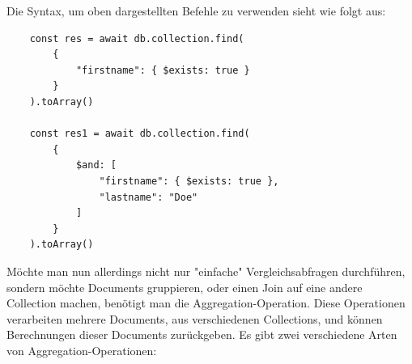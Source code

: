 \cite{mongodb_query_operations}
\newline
Die Syntax, um oben dargestellten Befehle zu verwenden sieht wie folgt aus:
\newline
\begin{lstlisting}
    const res = await db.collection.find(
        {
            "firstname": { $exists: true }
        }
    ).toArray()

    const res1 = await db.collection.find(
        {
            $and: [
                "firstname": { $exists: true },
                "lastname": "Doe"
            ]
        }
    ).toArray()
\end{lstlisting}
\cite{mongodb_query_basics}
\newline
Möchte man nun allerdings nicht nur "einfache" Vergleichsabfragen durchführen, sondern möchte Documents gruppieren, oder einen Join auf eine andere Collection machen, benötigt man die Aggregation-Operation. Diese Operationen verarbeiten mehrere Documents, aus verschiedenen Collections, und können Berechnungen dieser Documents zurückgeben. Es gibt zwei verschiedene Arten von Aggregation-Operationen:
